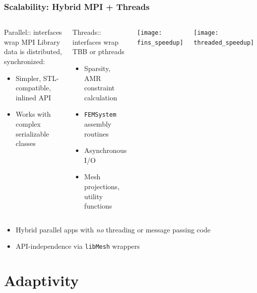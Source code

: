 \documentclass[mathserif]{beamer}
\newcommand{\libMesh}{\texttt{libMesh}\xspace}
\begin{document}
\begin{frame}
\frametitle{Scalability: Hybrid MPI + Threads}

\begin{columns}
\begin{block}{Parallel:: interfaces wrap MPI}
Library data is distributed, synchronized:
\begin{itemize}
	\item Simpler, STL-compatible, inlined API
	\item Works with complex serializable classes
\end{itemize}
\end{block}

\begin{block}{Threads:: interfaces wrap TBB or pthreads}
\begin{itemize}
	\item Sparsity, AMR constraint calculation
	\item {\texttt{FEMSystem}} assembly routines
	\item Asynchronous I/O
	\item Mesh projections, utility functions
\end{itemize}
\end{block}

\center
\texttt{[image: fins\_speedup]}

\center
\texttt{[image: threaded\_speedup]}

\end{columns}

\begin{itemize}
	\item Hybrid parallel apps with {\emph{no}}
		threading or message passing code
	\item API-independence via \libMesh{} wrappers
\end{itemize}
\end{frame}




\section{Adaptivity}
\end{document}
